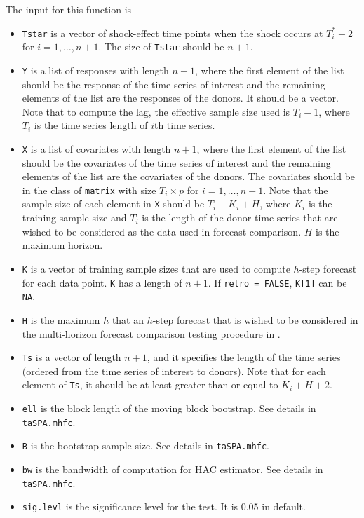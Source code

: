 \documentclass[12pt]{article}
\begin{document}
 The input for this function is
\begin{itemize}
	\item \texttt{Tstar} is a vector of shock-effect time points when the shock occurs at $T^*_i+2$ for $i = 1, \ldots, n+1$. The size of \texttt{Tstar} should be $n+1$. 
	\item \texttt{Y} is a list of responses with length $n +1$,  where the first element of the list should be the response of the time series of interest and the remaining elements of the list are the responses of the donors. It should be a vector.  Note  that to compute the lag, the effective sample size used is $T_i - 1$, where $T_i$ is the time series length of $i$th time series.
	\item \texttt{X} is a list of covariates with length $n+1$, where the first element of the list should be the covariates of the time series of interest and the remaining elements of the list are the covariates of the donors. The covariates should be in the class of \texttt{matrix} with size $T_i\times p$ for $i = 1, \ldots, n+1$. Note that the sample size of each element  in \texttt{X} should be  $T_i+ K_i + H$, where $K_i$ is the training sample size and $T_i$ is the length of the donor time series that are wished to be considered as the data used in forecast comparison. $H$ is the maximum horizon.
	\item \texttt{K} is a vector of training sample sizes that are used to compute $h$-step forecast for each data point. \texttt{K} has a length of $n+1$. If \texttt{retro = FALSE}, \texttt{K[1]} can be \texttt{NA}.
	\item \texttt{H} is the maximum $h$ that an $h$-step forecast that is wished to be considered in the multi-horizon forecast comparison testing procedure in .
	\item \texttt{Ts} is a vector of length $n+1$, and it specifies the length of the time series (ordered from the time series of interest to donors). Note that for each element of \texttt{Ts}, it should be at least greater than or equal to $K_i + H + 2$.
	\item \texttt{ell} is the block length of the moving block bootstrap. See details in \texttt{taSPA.mhfc}.
	\item \texttt{B} is the bootstrap sample size. See details in \texttt{taSPA.mhfc}.
	\item \texttt{bw} is the bandwidth of computation for HAC estimator. See details in \texttt{taSPA.mhfc}.
	\item \texttt{sig.levl} is the significance level for the test. It is 0.05 in default.

\end{itemize}
\end{document}
